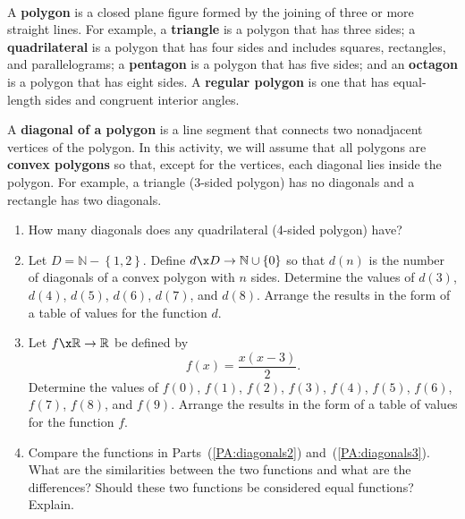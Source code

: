 \begin{previewactivity} \label{PA:diagonals} \hfill \\
A \textbf{polygon}
%
 is a closed plane figure formed by the joining of three or more straight lines. For example, a \textbf{triangle}
%
 is a polygon that has three sides; a \textbf{quadrilateral}
%
 is a polygon that  has four sides and includes squares, rectangles, and parallelograms; a \textbf{pentagon}
%
 is a polygon that  has five sides; and an \textbf{octagon}
%
 is a polygon that has eight sides. A \textbf{regular polygon}
%
%
 is one that has equal-length sides and congruent interior angles.

A \textbf{diagonal of a polygon}
%
%
 is a line segment that connects two nonadjacent vertices of the polygon.  In this activity, we will assume that all polygons are \textbf{convex polygons} so that, except for the vertices, each diagonal lies inside the polygon.  For example, a triangle (3-sided polygon) has no diagonals and a rectangle has two diagonals.

\begin{enumerate}
\item How many diagonals does any quadrilateral (4-sided polygon) have?

\item Let   $D = \mathbb{N} - \left\{ {1, 2} \right\}$.  Define   
$d\x D \to \mathbb{N} \cup \left\{ 0 \right\}$ so that   $d( n )$ is the number of diagonals of a  convex polygon with  $n$  sides.   Determine the values of $d(3)$, $d(4)$, $d(5)$, $d(6)$, $d(7)$, and $d(8)$.  Arrange the results in the form of a table of values for the function $d$.
\label{PA:diagonals2}

\item Let  $f\x \mathbb{R} \to \mathbb{R}$  be defined by  
\[
f( x ) = \frac{{x\left( {x - 3} \right)}}{2}.
\]
Determine the values of $f(0)$, $f(1)$, $f(2)$, $f(3)$, $f(4)$, $f(5)$, $f(6)$, $f(7)$, 
$f(8)$, and $f(9)$.  Arrange the results in the form of a table of values for the function $f$\!.
\label{PA:diagonals3}%


\item	Compare the functions in Parts~(\ref{PA:diagonals2}) and~(\ref{PA:diagonals3}).  What are the similarities between the two functions and what are the differences?  Should these two functions be considered equal functions?  Explain.
\end{enumerate}
\end{previewactivity}
\hbreak


\endinput
